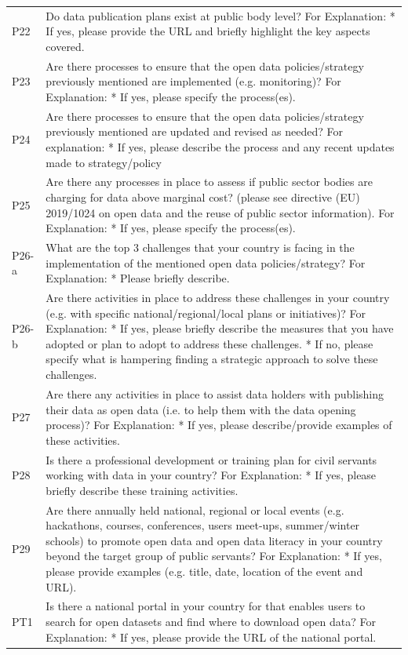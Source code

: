 {\begin{longtable}[]{@{}
  L{0.1386}
  L{0.8614}@{}}
P22 & Do data publication plans exist at public body level? For Explanation: * If yes, please provide the URL and briefly highlight the key aspects covered. \\
P23 & Are there processes to ensure that the open data policies/strategy previously mentioned are implemented (e.g. monitoring)? For Explanation: * If yes, please specify the process(es). \\
P24 & Are there processes to ensure that the open data policies/strategy previously mentioned are updated and revised as needed? For explanation: * If yes, please describe the process and any recent updates made to strategy/policy \\
P25 & Are there any processes in place to assess if public sector bodies are charging for data above marginal cost? (please see directive (EU) 2019/1024 on open data and the reuse of public sector information). For Explanation: * If yes, please specify the process(es). \\
P26-a & What are the top 3 challenges that your country is facing in the implementation of the mentioned open data policies/strategy? For Explanation: * Please briefly describe. \\
P26-b & Are there activities in place to address these challenges in your country (e.g. with specific national/regional/local plans or initiatives)? For Explanation: * If yes, please briefly describe the measures that you have adopted or plan to adopt to address these challenges. * If no, please specify what is hampering finding a strategic approach to solve these challenges. \\
P27 & Are there any activities in place to assist data holders with publishing their data as open data (i.e. to help them with the data opening process)? For Explanation: * If yes, please describe/provide examples of these activities. \\
P28 & Is there a professional development or training plan for civil servants working with data in your country? For Explanation: * If yes, please briefly describe these training activities. \\
P29 & Are there annually held national, regional or local events (e.g. hackathons, courses, conferences, users meet-ups, summer/winter schools) to promote open data and open data literacy in your country beyond the target group of public servants? For Explanation: * If yes, please provide examples (e.g. title, date, location of the event and URL). \\
PT1 & Is there a national portal in your country for that enables users to search for open datasets and find where to download open data? For Explanation: * If yes, please provide the URL of the national portal. \\

\end{longtable}}
